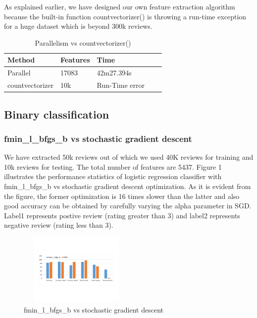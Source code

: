 \documentclass{article}
\begin{document}
As explained earlier, we have designed our own feature extraction algorithm because the built-in function countvectorizer() is throwing a run-time exception for a huge dataset which is beyond 300k reviews.


\begin{table}[H]
\caption{Parallelism vs countvectorizer()}
\label{sample-table}
\begin{center}
\begin{small}
\begin{sc}
\begin{tabular}{lllll}
\hline
Method & Features & Time \\
\hline
Parallel  & 17083 & 42m27.394s \\
countvectorizer  & 10k & Run-Time error \\
\hline
\end{tabular}
\end{sc}
\end{small}
\end{center}
\end{table}


\subsection{Binary classification}
\subsubsection{fmin\_l\_bfgs\_b vs stochastic gradient descent}
We have extracted 50k reviews out of which we used 40K reviews for training and 10k reviews for testing. The total number of features are 5437. 
Figure 1 illustrates the performance statistics of logistic regression classifier with fmin\_l\_bfgs\_b vs stochastic gradient descent optimization. As it is evident from the figure, the former optimization is 16 times slower than the latter and also good accuracy can be obtained by carefully varying the alpha parameter in SGD. Label1 represents postive review (rating greater than 3) and label2 represents negative review (rating less than 3).

\begin{figure}[H]
  \caption{fmin\_l\_bfgs\_b vs stochastic gradient descent}
  \centering
    \includegraphics[width=0.5\textwidth,height=3.5cm]{newtemp}
\end{figure}
\end{document}
